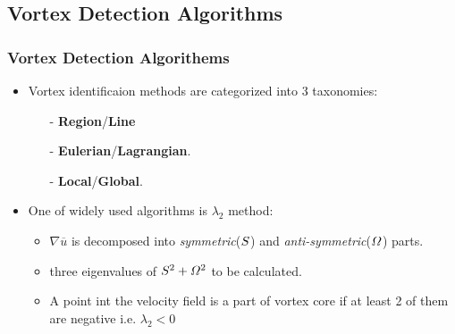 \documentclass[aspectratio=169]{beamer}
\begin{document}
\subsection{Vortex Detection Algorithms}
\begin{frame}
  \frametitle{Vortex Detection Algorithems}
  \begin{itemize}
  \item Vortex identificaion methods are categorized into 3 taxonomies:
    \begin{itemize}
      \item[-] \textbf{Region}/\textbf{Line}
      \item[-] \textbf{Eulerian}/\textbf{Lagrangian}.
      \item[-] \textbf{Local}/\textbf{Global}.
    \end{itemize}
    \item One of widely used algorithms is $\lambda_{2}$ method:
    \begin{itemize}
      \item  $\nabla \overline{u}$ is decomposed into \textit{symmetric}($\mathnormal{S}$) and \textit{anti-symmetric}($\mathnormal{\Omega}$) parts.
      \item three eigenvalues of $\mathnormal{S}^2+\mathnormal{\Omega}^2$ to be calculated.
      \item A point int the velocity field is a part of vortex core if at least 2 of them are negative i.e. $\lambda_{2}<0$
    \end{itemize}
  \end{itemize}     
  
\end{frame}

\end{document}
